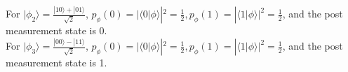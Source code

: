 \documentclass[11pt]{article}
\newenvironment{solution}{\begin{mdframed}[skipabove=\baselineskip,innertopmargin=\baselineskip,innerbottommargin=\baselineskip]
  }{\end{mdframed}}
\begin{document}
\begin{solution}
\begin{enumerate}[(i)]
    For $|\phi_2\rangle = \frac{|10\rangle+|01\rangle}{\sqrt{2}}$,  $p_\phi(0) = |\langle0|\phi\rangle|^2 = \frac{1}{2}, p_\phi(1) = |\langle1|\phi\rangle|^2 = \frac{1}{2}$, and the post measurement state is 0. \\
    
    For $|\phi_3\rangle = \frac{|00\rangle-|11\rangle}{\sqrt{2}}$,  $p_\phi(0) = |\langle0|\phi\rangle|^2 = \frac{1}{2}, p_\phi(1) = |\langle1|\phi\rangle|^2 = \frac{1}{2}$, and the post measurement state is 1. \\
\end{enumerate}
\end{solution}


 
 
 
\end{document}
